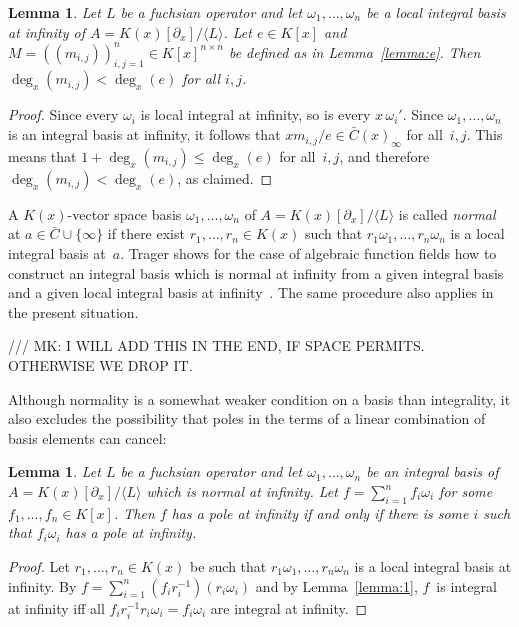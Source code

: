 \documentclass{sig-alternate}
\newtheorem{lemma}[theorem]{Lemma}
\def\<#1>{\langle#1\rangle}
\begin{document}
\begin{lemma} \label{lemma:degM}
  Let $L$ be a fuchsian operator and let $\omega_1,\dots,\omega_n$ be a local integral
  basis at infinity of $A=K(x)[\partial_x]/\<L>$. Let $e\in K[x]$ and $M=((m_{i,j}))_{i,j=1}^n\in K[x]^{n\times n}$
  be defined as in Lemma~\ref{lemma:e}. Then $\deg_x(m_{i,j})<\deg_x(e)$ for all $i,j$.
\end{lemma}
\begin{proof}
  Since every $\omega_i$ is local integral at infinity, so is every $x\,\omega_i'$.
  Since $\omega_1,\dots,\omega_n$ is an integral basis at infinity, it follows that
  $xm_{i,j}/e\in\bar C(x)_\infty$ for all~$i,j$. This means that $1+\deg_x(m_{i,j})\leq\deg_x(e)$
  for all~$i,j$, and therefore $\deg_x(m_{i,j})<\deg_x(e)$, as claimed.
\end{proof}

A $K(x)$-vector space basis $\omega_1,\dots,\omega_n$ of $A=K(x)[\partial_x]/\<L>$ is
called \emph{normal} at $a\in\bar C\cup\{\infty\}$ if there exist $r_1,\dots,r_n\in
K(x)$ such that $r_1\omega_1,\dots,r_n\omega_n$ is a local integral basis
at~$a$. Trager shows for the case of algebraic function fields how to construct
an integral basis which is normal at infinity from a given integral basis and
a given local integral basis at infinity~\cite{trager84}. The same procedure also applies
in the present situation. %

/// MK: I WILL ADD THIS IN THE END, IF SPACE PERMITS. OTHERWISE WE DROP IT. 

Although normality is a somewhat weaker condition on a basis than integrality,
it also excludes the possibility that poles in the terms of a linear combination
of basis elements can cancel:

\begin{lemma}\label{lemma:3}
  Let $L$ be a fuchsian operator and let $\omega_1,\dots,\omega_n$ be an integral basis of $A=K(x)[\partial_x]/\<L>$
  which is normal at infinity.
  Let $f=\sum_{i=1}^n f_i\omega_i$ for some $f_1,\dots,f_n\in K[x]$.
  Then $f$ has a pole at infinity if and only if
  there is some $i$ such that $f_i\omega_i$ has a pole at infinity.
\end{lemma}
\begin{proof}
  Let $r_1,\dots,r_n\in K(x)$ be such that $r_1\omega_1,\dots,r_n\omega_n$ is a
  local integral basis at infinity. By $f=\sum_{i=1}^n
  (f_ir_i^{-1})(r_i\omega_i)$ and by Lemma~\ref{lemma:1}, $f$~is integral at infinity iff all
  $f_ir_i^{-1}r_i\omega_i=f_i\omega_i$ are integral at infinity.
\end{proof}
\end{document}
